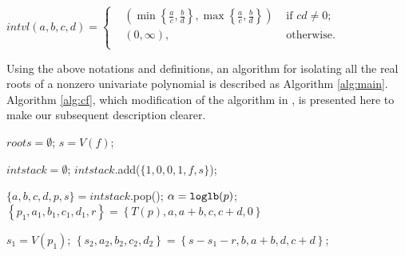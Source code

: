 \begin{definition}
$  intvl(a,b,c,d)=  \left\{\begin{aligned}
&  (\min\left\{ \frac{a}{c},\frac{b}{d} \right\},\max\left\{ \frac{a}{c},\frac{b}{d} \right\} ) &\text{ if } cd\neq0;\\
& (0,\infty), &\text{ otherwise}.\\
	\end{aligned}
	\right.
$
\end{definition}


Using the above notations and definitions, an algorithm for isolating all the real roots of a nonzero univariate polynomial is described as Algorithm \ref{alg:main}.
Algorithm \ref{alg:cf}, which    modification of the algorithm in \cite{akr08}, is presented here to make our subsequent description clearer.




\begin{algorithm}
	\caption{\algcf \label{alg:cf}}
	\DontPrintSemicolon
	
	$roots=\emptyset$;
	$s=V(f)$;\;
	
	$intstack=\emptyset$;
	$intstack$.add($\{1,0,0,1,f,s\}$);\;
	 {
		$\{a,b,c,d,p,s\}=intstack.$pop();
		$\alpha={\tt loglb}(p)$;\;
		$ \left\{ p_1,a_1,b_1,c_1,d_1,r \right\}=\left\{ T(p),a,a+b,c,c+d,0 \right\}$
		
		$s_1=V(p_1)$;
		$\left\{ s_2,a_2,b_2,c_2,d_2 \right\}=\left\{ s-s_1-r,b,a+b,d,c+d \right\}$;
		
	}
\end{algorithm}

